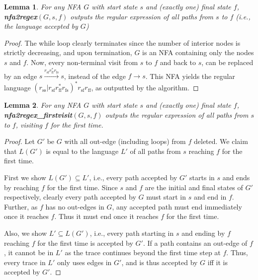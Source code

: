 \documentclass[conference]{IEEEtran}
\newtheorem{lemma}{Lemma}[section]
\theoremstyle{definition}
\theoremstyle{remark}
\begin{document}
\begin{lemma}
    For any NFA $G$ with start state $s$ and (exactly one) final state $f$, \textbf{nfa2regex}$(G, s, f)$ outputs the regular expression of all paths from $s$ to $f$ (i.e., the language accepted by $G$)
\end{lemma}
\begin{proof}
    The while loop clearly terminates since the number of interior nodes is strictly decreasing, and upon termination, $G$ is an NFA containing only the nodes $s$ and $f$. Now, every non-terminal visit from $s$ to $f$ and back to $s$, can be replaced by an edge $s\xrightarrow{r_\mathrm{sf}r_\mathrm{ff}^* r_\mathrm{fs}} s$, instead of the edge $f\to s$. This NFA yields the regular language $(r_\mathrm{ss}|r_\mathrm{sf}r_\mathrm{ff}^* r_\mathrm{fs})^* r_\mathrm{sf} r_\mathrm{ff}$, as outputted by the algorithm.
\end{proof}

\begin{lemma}
    For any NFA $G$ with start state $s$ and (exactly one) final state $f$, \textbf{nfa2regex\_firstvisit}$(G, s, f)$ outputs the regular expression of all paths from $s$ to $f$, visiting $f$ for the first time.
\end{lemma}
\begin{proof}
    Let $G'$ be $G$ with all out-edge (including loops) from $f$ deleted. We claim that $L(G')$ is equal to the language $L'$ of all paths from $s$ reaching $f$ for the first time.

    First we show $L(G') \subseteq L'$, i.e., every path accepted by $G'$ starts in $s$ and ends by reaching $f$ for the first time. Since $s$ and $f$ are the initial and final states of $G'$ respectively, clearly every path accepted by $G$ must start in $s$ and end in $f$. Further, as $f$ has no out-edges in $G$, any accepted path must end immediately once it reaches $f$. Thus it must end once it reaches $f$ for the first time.

    Also, we show $L' \subseteq L(G')$, i.e., every path starting in $s$ and ending by $f$ reaching $f$ for the first time is accepted by $G'$. If a path contains an out-edge of $f$, it cannot be in $L'$ as the trace continues beyond the first time step at $f$. Thus, every trace in $L'$ only uses edges in $G'$, and is thus accepted by $G$ iff it is accepted by $G'$.
\end{proof}
\end{document}
